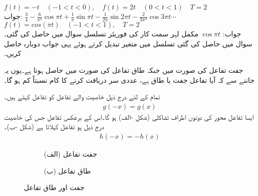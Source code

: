 $f(t)=-t\quad (-1<t<0),\quad f(t)=2t\quad (0<t<1)\quad T=2$\\
جواب:\quad
$\tfrac{3}{4}-\tfrac{6}{\pi^2}\cos \pi t+\tfrac{1}{\pi}\sin \pi t-\tfrac{1}{2\pi}\sin 2\pi t-\tfrac{2}{3\pi^2}\cos 3\pi t\cdots$
\quad
$f(t)=cos(\pi t)\quad (-1<t<1),\quad T=2$\\
جواب:\quad
$\cos \pi t$
\quad
مکمل لہر سمت کار کی فوریئر تسلسل سوال  میں حاصل کی گئی۔سوال  میں حاصل کی گئی تسلسل میں متغیر تبدیل کرتے ہوئے یہی جواب دوبارہ حاصل کریں۔

جفت تفاعل کی صورت میں  جبکہ طاق تفاعل کی صورت میں  حاصل ہوتا ہے۔یوں یہ جاننے سے کہ آیا تفاعل جفت یا طاق ہے، عددی سر دریافت کرنے کا کام نسبتاً کم ہو گا۔

تمام  کے لئے درج ذیل خاصیت والے تفاعل  کو  تفاعل کہتے ہیں۔
\begin{align}\label{مساوات_فوریئر_جفت_تعریف}
g(-x)=g(x)
\end{align}
ایسا تفاعل  محور کی دونوں اطراف تشاکلی (شکل -الف) ہو گا۔اس کے برعکس تفاعل  جس کی خاصیت درج ذیل ہو  تفاعل کہلاتا ہے (شکل -ب)۔
\begin{align}\label{مساوات_فوریئر_طاق_تعریف}
h(-x)=-h(x)
\end{align}
%
\begin{figure}
\centering
\begin{subfigure}{0.5\textwidth}
\centering
{}
\caption*{(الف) جفت تفاعل}
\end{subfigure}%
\begin{subfigure}{0.5\textwidth}
\centering
{}
\caption*{(ب) طاق تفاعل}
\end{subfigure}%
\caption{جفت اور طاق تفاعل}
\label{شکل_فوریئر_جفت_طاق}
\end{figure}

